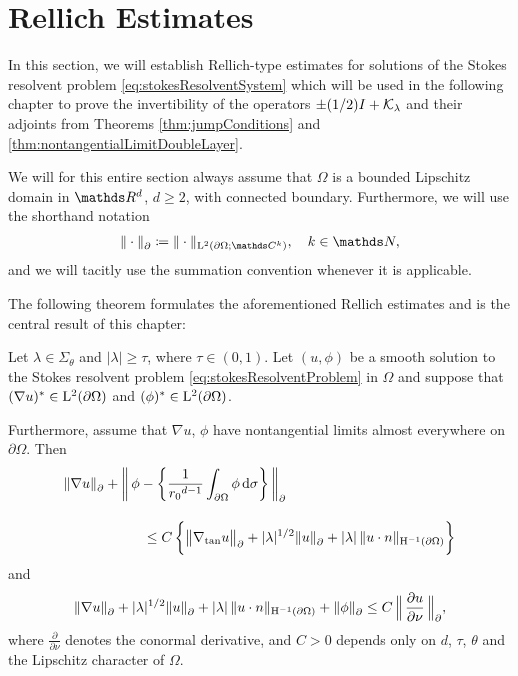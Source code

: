 \chapter{Rellich Estimates}
\label{chap:4}

In this section, we will establish Rellich-type estimates for solutions of the Stokes resolvent problem \eqref{eq:stokesResolventSystem} which will be used in the following chapter to prove the invertibility of the operators $\pm(1/2)I + \mathcal{K}_{\lambda}$ and their adjoints from Theorems  \ref{thm:jumpConditions} and \ref{thm:nontangentialLimitDoubleLayer}.

We will for this entire section always assume that $\Omega$ is a bounded Lipschitz domain in $\R^d$, $d \geq 2$, with connected boundary.
Furthermore, we will use the shorthand notation
\begin{align*}
    \| \cdot \|^{}_{\partial} \coloneqq \| \cdot \|_{\Ell^2(\partial\Omega; \C^k)}, \quad k \in \N,
\end{align*}
and we will tacitly use the summation convention whenever it is applicable.

The following theorem formulates the aforementioned Rellich estimates and is the central result of this chapter:

\begin{thm}
  \label{thm:rellich}
  Let $\lambda \in \Sigma_\theta$ and $|\lambda| \geq \tau$, where 
  $\tau \in (0,1)$.
  Let $(u,\phi)$ be a smooth solution to the Stokes resolvent problem \eqref{eq:stokesResolventProblem} in $\Omega$ and suppose that $(\nabla u)^* \in \mathrm{L}^2(\partial\Omega)$ and $(\phi)^* \in \mathrm{L}^2(\partial\Omega)$.

  Furthermore, assume that $\nabla u$, $\phi$ have nontangential limits almost everywhere on $\partial\Omega$.
  Then
  \begin{align}
    \label{eq:rellich1}
    \begin{alignedat}{1}
        &\|\nabla u\|^{}_\partial + \bigg\|\,\phi - \bigg\{ \frac{1}{{r_0}^{d - 1}}\int_{\partial\Omega} \phi \, {\operatorname{d}\!{\sigma}} \bigg\} \, \bigg\|^{}_\partial \\[1em]
      &\hspace{2cm} \leq C\, \bigg\{ \big\|\nabla_{\mathrm{tan}} u\big\|^{}_\partial + |\lambda|^{1/2} \|u\|^{}_\partial + |\lambda| \, \|u \cdot n\|_{\mathrm{H}^{-1}(\partial\Omega)} \bigg\}
    \end{alignedat}
  \end{align}
  and
  \begin{align}
    \label{eq:rellich2}
    \|\nabla u\|^{}_\partial + |\lambda|^{1/2} \|u\|^{}_\partial + |\lambda| \, \|u \cdot n\|_{\mathrm{H}^{-1}(\partial\Omega)} + \|\phi\|^{}_\partial
    \leq C \, \Big\|\, \frac{\partial u}{\partial \nu} \, \Big\|^{}_\partial,
  \end{align}
  where $\frac{\partial}{\partial \nu}$ denotes the conormal derivative, and $C > 0$ depends only on $d$, $\tau$, $\theta$ and the Lipschitz character of $\Omega$.
\end{thm}

